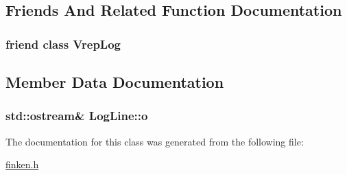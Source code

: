 \subsection{Friends And Related Function Documentation}
\subsubsection[{\texorpdfstring{Vrep\+Log}{VrepLog}}]{\setlength{\rightskip}{0pt plus 5cm}friend class {\bf Vrep\+Log}\hspace{0.3cm}{\ttfamily [friend]}}\hypertarget{classLogLine_a4b85b5c9be56c4b49e99130f36f2df1d}{}\label{classLogLine_a4b85b5c9be56c4b49e99130f36f2df1d}


\subsection{Member Data Documentation}
\subsubsection[{\texorpdfstring{o}{o}}]{\setlength{\rightskip}{0pt plus 5cm}std\+::ostream\& Log\+Line\+::o\hspace{0.3cm}{\ttfamily [private]}}\hypertarget{classLogLine_aa968a7a5fadffd96309f7c18f8a1243a}{}\label{classLogLine_aa968a7a5fadffd96309f7c18f8a1243a}


The documentation for this class was generated from the following file\+:\begin{DoxyCompactItemize}
\item 
\hyperlink{finken_8h}{finken.\+h}\end{DoxyCompactItemize}

